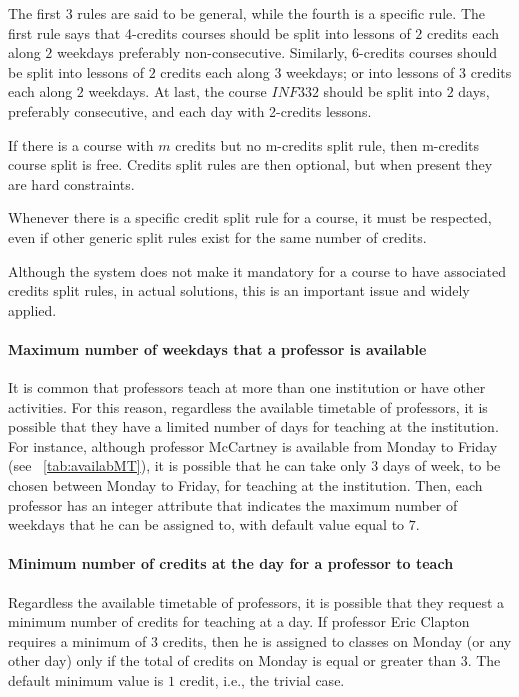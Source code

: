 The first $3$ rules are said to be general, while the fourth is a specific rule. The first rule says that 4-credits courses should be split into lessons of $2$ credits each along $2$ weekdays preferably non-consecutive. Similarly, 6-credits courses should be split into lessons of $2$ credits each along $3$ weekdays; or into lessons of $3$ credits each along $2$ weekdays. At last, the course $INF332$ should be split into $2$ days, preferably consecutive, and each day with 2-credits lessons.

If there is a course with $m$ credits but no m-credits split rule, then m-credits course split is free. Credits split rules are then optional, but when present they are hard constraints.

Whenever there is a specific credit split rule for a course, it must be respected, even if other generic split rules exist for the same number of credits.

Although the system does not make it mandatory for a course to have associated credits split rules, in actual solutions, this is an important issue and widely applied.


\paragraph{Maximum number of weekdays that a professor is available}
\label{constrmaxdaysprof}

It is common that professors teach at more than one institution or have other activities. For this reason, regardless the available timetable of professors, it is possible that they have a limited number of days for teaching at the institution. For instance, although professor McCartney is available from Monday to Friday (see ~\ref{tab:availabMT}), it is possible that he can take only $3$ days of week, to be chosen between Monday to Friday, for teaching at the institution. Then, each professor has an integer attribute that indicates the maximum number of weekdays that he can be assigned to, with default value equal to $7$.


\paragraph{Minimum number of credits at the day for a professor to teach}
\label{constrmincredsdayprof}

Regardless the available timetable of professors, it is possible that they request a minimum number of credits for teaching at a day. If professor Eric Clapton requires a minimum of $3$ credits, then he is assigned to classes on Monday (or any other day) only if the total of credits on Monday is equal or greater than $3$. The default minimum value is $1$ credit, i.e., the trivial case.


